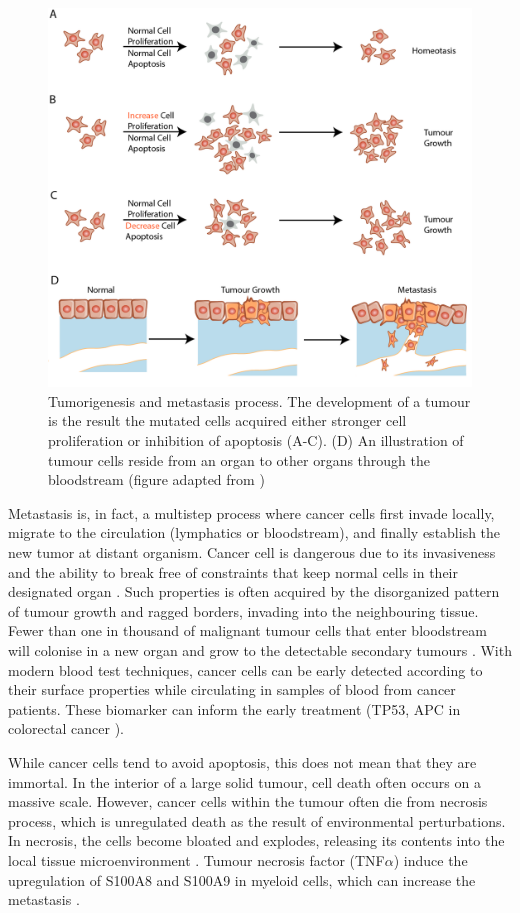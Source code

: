 \begin{figure}[htp]
    \centering
    \includegraphics[width=0.7\columnwidth]{Chapter1/Figures/Chap1_figure3.png}
    \caption{Tumorigenesis and metastasis process. The development of a tumour is the result the mutated cells acquired either stronger cell proliferation or inhibition of apoptosis (A-C). (D) An illustration of tumour cells reside from an organ to other organs through the bloodstream (figure adapted from \cite{alberts2018molecular})}
    \label{fig:Chap1_figure3}
\end{figure}

Metastasis is, in fact, a multistep process where cancer cells first invade locally, migrate to the circulation (lymphatics or bloodstream), and finally establish the new tumor at distant organism. Cancer cell is dangerous due to its invasiveness and the ability to break free of constraints that keep normal cells in their designated organ \cite{greaves2012clonal}. Such properties is often acquired by the disorganized pattern of tumour growth and ragged borders, invading into the neighbouring tissue. Fewer than one in thousand of malignant tumour cells that enter bloodstream will colonise in a new organ and grow to the detectable secondary tumours \cite{joyce2009microenvironmental}. With modern blood test techniques, cancer cells can be early detected according to their surface properties while circulating in samples of blood from cancer patients. These biomarker can inform the early treatment (\ie TP53, APC in colorectal cancer \cite{markowitz2009molecular}). 

While cancer cells tend to avoid apoptosis, this does not mean that they are immortal. In the interior of a large solid tumour, cell death often occurs on a massive scale. However, cancer cells within the tumour often die from necrosis process, which is unregulated death as the result of environmental perturbations. In necrosis, the cells become bloated and explodes, releasing its contents into the local tissue microenvironment \cite{hanahan2011hallmarksnext}. Tumour necrosis factor (TNF$\alpha$) induce the upregulation of S100A8 and S100A9 in myeloid cells, which can increase the metastasis \cite{hiratsuka2008s100a8, hiratsuka2006tumour}. 

